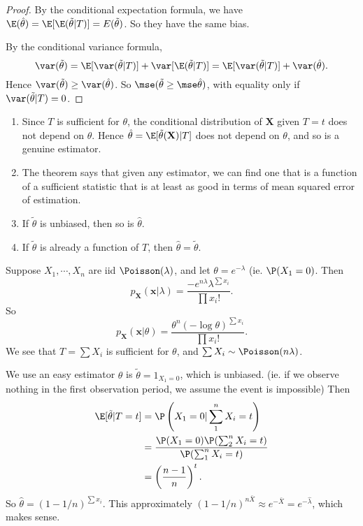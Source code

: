 \documentclass[a4paper]{article}
\begin{document}
\begin{proof}
  By the conditional expectation formula, we have $\E(\hat{\theta}) = \E[\E(\tilde{\theta}|T)] = E(\tilde{\theta})$. So they have the same bias.

  By the conditional variance formula,
  \[
    \var(\tilde{\theta}) = \E[\var (\tilde{\theta}|T)] + \var [\E(\tilde{\theta}|T)] = \E[\var(\tilde{\theta}|T)] + \var(\hat{\theta}).
  \]
  Hence $\var(\tilde{\theta}) \geq \var (\hat{\theta})$. So $\mse(\tilde{\theta} \geq \mse\hat{\theta})$, with equality only if $\var(\tilde{\theta}|T) = 0$.
\end{proof}
\note
\begin{enumerate}
  \item Since $T$ is sufficient for $\theta$, the conditional distribution of $\mathbf{X}$ given $T = t$ does not depend on $\theta$. Hence $\hat{\theta} = \E[\tilde{\theta}(\mathbf{X})|T]$ does not depend on $\theta$, and so is a genuine estimator.
  \item The theorem says that given any estimator, we can find one that is a function of a sufficient statistic that is at least as good in terms of mean squared error of estimation.
  \item If $\tilde{\theta}$ is unbiased, then so is $\hat{\theta}$.
  \item If $\tilde{\theta}$ is already a function of $T$, then $\hat{\theta} = \tilde{\theta}$.
\end{enumerate}

\begin{eg}
  Suppose $X_1, \cdots, X_n$ are iid $\Poisson(\lambda)$, and let $\theta = e^{-\lambda}$ (ie. $\P(X_1 = 0)$. Then
  \[
    p_\mathbf{X}(\mathbf{x}|\lambda) =\frac{-e^{n\lambda}\lambda^{\sum x_i}}{\prod x_i!}.
  \]
  So
  \[
    p_\mathbf{X}(\mathbf{x}|\theta) = \frac{\theta^n(-\log \theta)^{\sum x_i}}{\prod x_i!}.
  \]
  We see that $T = \sum X_i$ is sufficient for $\theta$, and $\sum X_i \sim \Poisson (n\lambda)$.

  We use an easy estimator $\theta$ is $\tilde{\theta} = 1_{X_1 = 0}$, which is unbiased. (ie. if we observe nothing in the first observation period, we assume the event is impossible) Then
  \begin{align*}
    \E[\tilde{\theta}| T = t] &= \P\left(X_1 = 0|\sum_1^n X_i = t\right)\\
    &= \frac{\P(X_1 = 0)\P(\sum_2^n X_i = t)}{\P(\sum_1^n X_i = t)}\\
    &= \left(\frac{n - 1}{n}\right)^t.
  \end{align*}
  So $\hat{\theta} = (1 - 1/n)^{\sum x_i}$. This approximately $(1 - 1/n)^{n\bar{X}} \approx e^{-\bar X} = e^{-\hat{\lambda}}$, which makes sense.
\end{eg}
\end{document}
